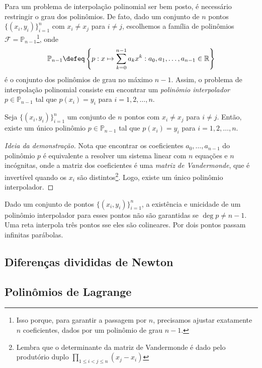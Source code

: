 \documentclass{article}
\begin{document}
Para um problema de interpolação polinomial ser bem posto, é necessário restringir o grau dos polinômios. De fato, dado um conjunto de \(n\) pontos \(\{(x_i, y_i)\}_{i=1}^{n}\) com \(x_i \neq x_j\) para \(i \neq j\), escolhemos a família de polinômios \(\mathcal{F} = \mathbb{P}_{n-1}\)\footnote{Isso porque, para garantir a passagem por \(n\), precisamos ajustar exatamente \(n\) coeficientes, dados por um polinômio de grau \(n-1\).}, onde \[\mathbb{P}_{n-1} \defeq \left\{p: x \mapsto \sum_{k=0}^{n-1} a_k x^k : a_0, a_1, \ldots, a_{n-1} \in \mathbb{R}\right\}\] é o conjunto dos polinômios de grau no máximo \(n-1\). 
Assim, o problema de interpolação polinomial consiste em encontrar um \emph{polinômio interpolador} \(p \in \mathbb{P}_{n-1}\) tal que \(p(x_i) = y_i\) para \(i = 1, 2, \ldots, n\).

\begin{thm}
    Seja \(\{(x_i, y_i)\}_{i=1}^{n}\) um conjunto de \(n\) pontos com \(x_i \neq x_j\) para \(i \neq j\). Então, existe um único polinômio \(p \in \mathbb{P}_{n-1}\) tal que \(p(x_i) = y_i\) para \(i = 1, 2, \ldots, n\).
\end{thm}

\begin{proof}[Ideia da demonstração]
    Nota que encontrar os coeficientes \(a_0, \ldots, a_{n-1}\) do polinômio \(p\) é equivalente a resolver um sistema linear com \(n\) equações e \(n\) incógnitas, onde a matriz dos coeficientes é uma \emph{matriz de Vandermonde}, que é invertível quando os \(x_i\) são distintos\footnote{Lembra que o determinante da matriz de Vandermonde é dado pelo produtório duplo \(\prod_{1 \leq i < j \leq n} (x_j - x_i)\)}. Logo, existe um único polinômio interpolador.
\end{proof}

\begin{rem}
    Dado um conjunto de pontos \(\{(x_i,y_i)\}_{i=1}^n\), a existência e unicidade de um polinômio interpolador para esses pontos não são garantidas se \(\deg p \neq n-1\). Uma reta interpola três pontos sse eles são colineares. Por dois pontos passam infinitas parábolas.
\end{rem}

\subsection{Diferenças divididas de Newton}



\subsection{Polinômios de Lagrange}
\end{document}
